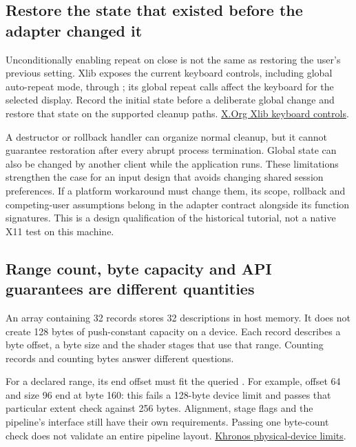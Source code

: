 \subsection{Restore the state that existed before the adapter changed it}\label{05-engine-i-ch024-restore-the-state-that-existed-before-the-adapter-changed-it}

\hypertarget{05-engine-i-ch024-restore-the-state-that-existed-before-the-adapter-changed-it}{}

Unconditionally enabling repeat on close is not the same as restoring the user's previous setting. Xlib exposes the current keyboard controls, including global auto-repeat mode, through ; its global repeat calls affect the keyboard for the selected display. Record the initial state before a deliberate global change and restore that state on the supported cleanup paths. \href{https://www.x.org/releases/X11R7.6/doc/libX11/specs/libX11/libX11.html}{X.Org Xlib keyboard controls}.

A destructor or rollback handler can organize normal cleanup, but it cannot guarantee restoration after every abrupt process termination. Global state can also be changed by another client while the application runs. These limitations strengthen the case for an input design that avoids changing shared session preferences. If a platform workaround must change them, its scope, rollback and competing-user assumptions belong in the adapter contract alongside its function signatures. This is a design qualification of the historical tutorial, not a native X11 test on this machine.

\subsection{Range count, byte capacity and API guarantees are different quantities}\label{05-engine-i-ch024-range-count-byte-capacity-and-api-guarantees-are-different-quantities}

\hypertarget{05-engine-i-ch024-range-count-byte-capacity-and-api-guarantees-are-different-quantities}{}

An array containing 32  records stores 32 descriptions in host memory. It does not create 128 bytes of push-constant capacity on a device. Each record describes a byte offset, a byte size and the shader stages that use that range. Counting records and counting bytes answer different questions.

For a declared range, its end offset must fit the queried . For example, offset 64 and size 96 end at byte 160: this fails a 128-byte device limit and passes that particular extent check against 256 bytes. Alignment, stage flags and the pipeline's interface still have their own requirements. Passing one byte-count check does not validate an entire pipeline layout. \href{https://docs.vulkan.org/spec/latest/chapters/limits.html}{Khronos physical-device limits}.

